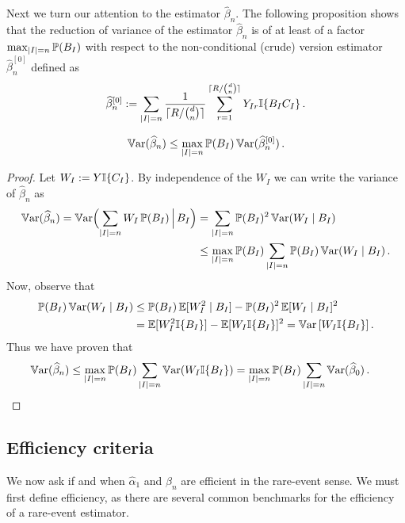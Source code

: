 Next we turn our attention to the estimator $\hat{\beta}_n$.
The following proposition shows that the reduction of variance of the estimator
$\hat{\beta}_n$ is of at least of a factor $\max_{\lvert I\rvert=n}\operatorname{{\mathbb P}}(B_I)$
with respect to the non-conditional (crude) version estimator $\hat{\beta}_n^{[0]}$
defined as
\begin{equation}
 \widehat{\beta}_n^{[0]}:=\sum_{\lvert I\rvert=n} \frac1{\lceil R / \binom{d}{n} \rceil} \sum_{r=1}^{\lceil R / \binom{d}{n} \rceil}  Y_{Ir}\mathbb{I}\{ B_IC_I \} \,.
\end{equation}
\begin{proposition}\label{prop:VarRedCMC}
 \begin{equation*}
  \operatorname{\mathbb{V}\mathrm{ar}}(\widehat{\beta}_n) \le \max_{\lvert I\rvert=n}\operatorname{{\mathbb P}}(B_I)
   \operatorname{\mathbb{V}\mathrm{ar}}(\widehat{\beta}_n^{[0]}) \,.
 \end{equation*}
\end{proposition}
\begin{proof}
Let $W_I := Y\mathbb{I}\{ C_I \}$.  By independence of the $W_I$
we can write the variance of $\hat{\beta}_n$ as
\begin{align*}
\operatorname{\mathbb{V}\mathrm{ar}}(\widehat{\beta}_n)
  =\operatorname{\mathbb{V}\mathrm{ar}}\Bigl(\sum_{\lvert I\rvert=n} W_I \operatorname{{\mathbb P}}(B_I) \,\Big|\, B_I \Bigr)
     &=\sum_{\lvert I\rvert=n} \operatorname{{\mathbb P}}(B_I)^2 \operatorname{\mathbb{V}\mathrm{ar}}( W_I \mid B_I )\\
     &\le\max_{\lvert I\rvert=n}\operatorname{{\mathbb P}}(B_I)\sum_{\lvert I\rvert=n} \operatorname{{\mathbb P}}(B_I)\operatorname{\mathbb{V}\mathrm{ar}}( W_I \mid B_I )\,.
\end{align*}
Now, observe that
\begin{align*}
 \operatorname{{\mathbb P}}(B_I)\operatorname{\mathbb{V}\mathrm{ar}}( W_I \mid B_I )
   &\le\operatorname{{\mathbb P}}(B_I)\operatorname{{\mathbb E}}[ W_I^2 \mid B_I] -{\operatorname{{\mathbb P}}(B_I)^2\operatorname{{\mathbb E}}[W_I \mid B_I ]^2}\\
   &=\operatorname{{\mathbb E}}[W_I^2\mathbb{I}\{ B_I \}]-\operatorname{{\mathbb E}}[W_I\mathbb{I}\{ B_I \}]^2
   =\operatorname{\mathbb{V}\mathrm{ar}}\left[W_I\mathbb{I}\{ B_I \}\right].
\end{align*}
Thus we have proven that
\begin{align*}
\operatorname{\mathbb{V}\mathrm{ar}} ( \widehat{\beta}_n )
   &\le\max_{\lvert I\rvert=n}\operatorname{{\mathbb P}}(B_I)\sum_{\lvert I\rvert=n} \operatorname{\mathbb{V}\mathrm{ar}}( W_I\mathbb{I}\{ B_I \} )
   =\max_{\lvert I\rvert=n}\operatorname{{\mathbb P}}(B_I)\sum_{\lvert I\rvert=n}\operatorname{\mathbb{V}\mathrm{ar}}(\widehat{\beta}_0 )\,.
\end{align*}
\end{proof}


\subsection{Efficiency criteria} \label{scn:criteria}

We now ask if and when $\hat{\alpha}_1$ and $\hat{\beta}_n$ are efficient in the rare-event sense. We must first define efficiency, as there are several common benchmarks for the efficiency of a rare-event estimator.


